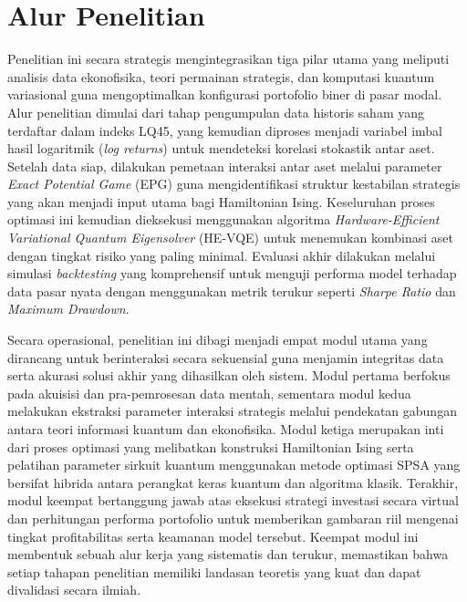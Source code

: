 \section{Alur Penelitian}
Penelitian ini secara strategis mengintegrasikan tiga pilar utama yang meliputi analisis data ekonofisika, teori permainan strategis, dan komputasi kuantum variasional guna mengoptimalkan konfigurasi portofolio biner di pasar modal. Alur penelitian dimulai dari tahap pengumpulan data historis saham yang terdaftar dalam indeks LQ45, yang kemudian diproses menjadi variabel imbal hasil logaritmik (\textit{log returns}) untuk mendeteksi korelasi stokastik antar aset. Setelah data siap, dilakukan pemetaan interaksi antar aset melalui parameter \textit{Exact Potential Game} (EPG) guna mengidentifikasi struktur kestabilan strategis yang akan menjadi input utama bagi Hamiltonian Ising. Keseluruhan proses optimasi ini kemudian dieksekusi menggunakan algoritma \textit{Hardware-Efficient Variational Quantum Eigensolver} (HE-VQE) untuk menemukan kombinasi aset dengan tingkat risiko yang paling minimal. Evaluasi akhir dilakukan melalui simulasi \textit{backtesting} yang komprehensif untuk menguji performa model terhadap data pasar nyata dengan menggunakan metrik terukur seperti \textit{Sharpe Ratio} dan \textit{Maximum Drawdown}.

Secara operasional, penelitian ini dibagi menjadi empat modul utama yang dirancang untuk berinteraksi secara sekuensial guna menjamin integritas data serta akurasi solusi akhir yang dihasilkan oleh sistem. Modul pertama berfokus pada akuisisi dan pra-pemrosesan data mentah, sementara modul kedua melakukan ekstraksi parameter interaksi strategis melalui pendekatan gabungan antara teori informasi kuantum dan ekonofisika. Modul ketiga merupakan inti dari proses optimasi yang melibatkan konstruksi Hamiltonian Ising serta pelatihan parameter sirkuit kuantum menggunakan metode optimasi SPSA yang bersifat hibrida antara perangkat keras kuantum dan algoritma klasik. Terakhir, modul keempat bertanggung jawab atas eksekusi strategi investasi secara virtual dan perhitungan performa portofolio untuk memberikan gambaran riil mengenai tingkat profitabilitas serta keamanan model tersebut. Keempat modul ini membentuk sebuah alur kerja yang sistematis dan terukur, memastikan bahwa setiap tahapan penelitian memiliki landasan teoretis yang kuat dan dapat divalidasi secara ilmiah.

